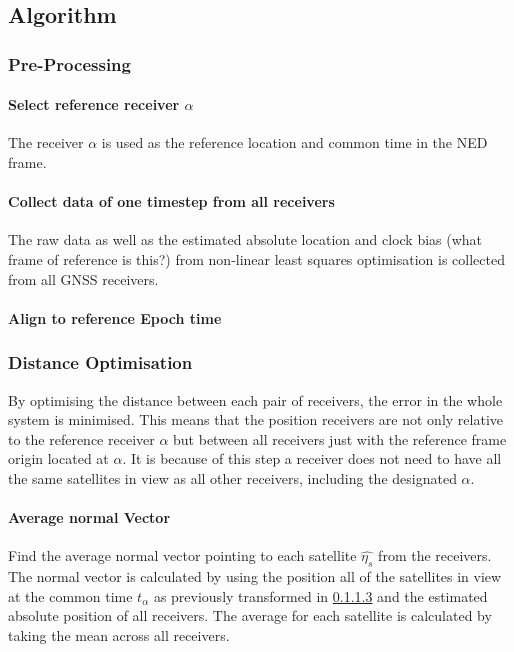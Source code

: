 \documentclass[11pt,a4paper]{article}
\begin{document}
\subsection{Algorithm}

\subsubsection{Pre-Processing}
\paragraph{Select reference receiver $\alpha$}
The receiver $\alpha$ is used as the reference location and common time in the NED frame. 
\paragraph{Collect data of one timestep from all receivers}
The raw data as well as the estimated absolute location and clock bias (what frame of reference is this?) from non-linear least squares optimisation is collected from all GNSS receivers.
\paragraph{Align to reference Epoch time}\label{timetransform}


\subsubsection{Distance Optimisation}
By optimising the distance between each pair of receivers, the error in the whole system is minimised. 
This means that the position receivers are not only relative to the reference receiver $\alpha$ but between all receivers just with the reference frame origin located at $\alpha$. It is because of this step a receiver does not need to have all the same satellites in view as all other receivers, including the designated $\alpha$.


\paragraph{Average normal Vector}
Find the average normal vector pointing to each satellite $\hat{\eta_s}$ from the receivers. The normal vector is calculated by using the position all of the satellites in view at the common time $t_{\alpha}$ as previously transformed in \ref{timetransform} and the estimated absolute position of all receivers. The average for each satellite is calculated by taking the mean across all receivers.
\end{document}
